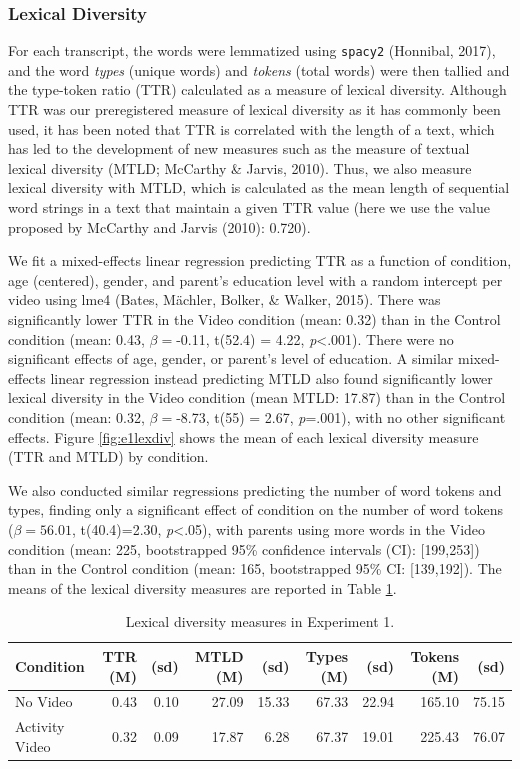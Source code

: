 \documentclass[man,floatsintext]{apa6}
\begin{document}
\hypertarget{lexical-diversity}{%
\subsubsection{Lexical Diversity}\label{lexical-diversity}}

For each transcript, the words were lemmatized using \texttt{spacy2} (Honnibal, 2017), and the word \emph{types} (unique words) and \emph{tokens} (total words) were then tallied and the type-token ratio (TTR) calculated as a measure of lexical diversity.
Although TTR was our preregistered measure of lexical diversity as it has commonly been used, it has been noted that TTR is correlated with the length of a text, which has led to the development of new measures such as the measure of textual lexical diversity (MTLD; McCarthy \& Jarvis, 2010).
Thus, we also measure lexical diversity with MTLD, which is calculated as the mean length of sequential word strings in a text that maintain a given TTR value (here we use the value proposed by McCarthy and Jarvis (2010): 0.720).

We fit a mixed-effects linear regression predicting TTR as a function of condition, age (centered), gender, and parent's education level with a random intercept per video using lme4 (Bates, Mächler, Bolker, \& Walker, 2015).
There was significantly lower TTR in the Video condition (mean: 0.32) than in the Control condition (mean: 0.43, \(\beta=\)-0.11, t(52.4) = 4.22, \emph{p}\textless{}.001).
There were no significant effects of age, gender, or parent's level of education.
A similar mixed-effects linear regression instead predicting MTLD also found significantly lower lexical diversity in the Video condition (mean MTLD: 17.87) than in the Control condition (mean: 0.32, \(\beta=\)-8.73, t(55) = 2.67, \emph{p}=.001), with no other significant effects.
Figure \ref{fig:e1lexdiv} shows the mean of each lexical diversity measure (TTR and MTLD) by condition.

We also conducted similar regressions predicting the number of word tokens and types, finding only a significant effect of condition on the number of word tokens (\(\beta= 56.01\), t(40.4)=2.30, \emph{p}\textless{}.05), with parents using more words in the Video condition (mean: 225, bootstrapped 95\% confidence intervals (CI): {[}199,253{]}) than in the Control condition (mean: 165, bootstrapped 95\% CI: {[}139,192{]}).
The means of the lexical diversity measures are reported in Table \ref{tab:e1tab}.

\begin{table}[t]

\caption{\label{tab:e1tab}Lexical diversity measures in Experiment 1.}
\centering
\begin{tabular}{l|r|r|r|r|r|r|r|r}
\hline
Condition & TTR (M) & (sd) & MTLD (M) & (sd) & Types (M) & (sd) & Tokens (M) & (sd)\\
\hline
No Video & 0.43 & 0.10 & 27.09 & 15.33 & 67.33 & 22.94 & 165.10 & 75.15\\
\hline
Activity Video & 0.32 & 0.09 & 17.87 & 6.28 & 67.37 & 19.01 & 225.43 & 76.07\\
\hline
\end{tabular}
\end{table}
\end{document}
